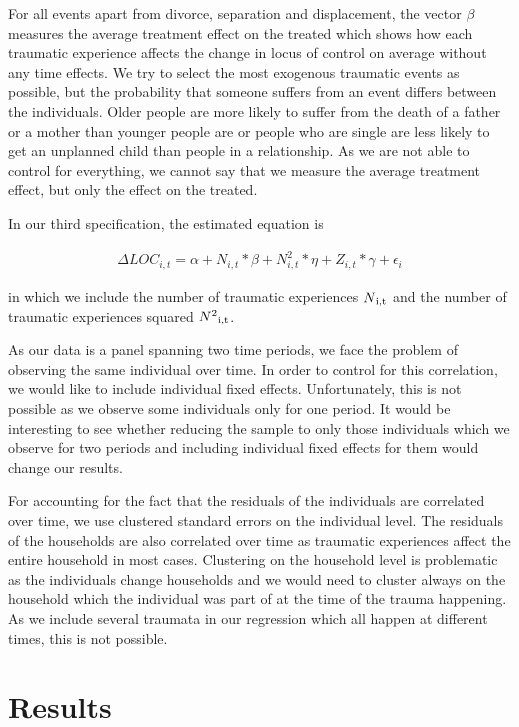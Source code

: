 \documentclass[12pt, a4paper, fleqn, parskip]{scrartcl}
\begin{document}
For all events apart from divorce, separation and displacement, the vector
$\beta$ measures the average treatment effect on the treated which shows how
each traumatic experience affects the change in locus of control on average
without any time effects. We try to select the most exogenous traumatic events
as possible, but the probability that someone suffers from an event differs
between the individuals. Older people are more likely to suffer from the death
of a father or a mother than younger people are or people who are single are
less likely to get an unplanned child than people in a relationship. As we are
not able to control for everything, we cannot say that we measure the average
treatment effect, but only the effect on the treated.

In our third specification, the estimated equation is

\begin{align}
    \Delta LOC_{i,t}= \alpha + N_{i,t} * \beta + N^{2}_{i,t} * \eta + Z_{i,t} *
    \gamma + \epsilon_{i}
\end{align}

in which we include the number of traumatic experiences $N \textsubscript{i,t}$
and the number of traumatic experiences squared $N
\textsuperscript{2}\textsubscript{i,t}$.

As our data is a panel spanning two time periods, we face the problem of
observing the same individual over time. In order to control for this
correlation, we would like to include individual fixed effects. Unfortunately,
this is not possible as we observe some individuals only for one period. It
would be interesting to see whether reducing the sample to only those
individuals which we observe for two periods and including individual fixed
effects for them would change our results.

For accounting for the fact that the residuals of the individuals are
correlated over time, we use clustered standard errors on the individual level.
The residuals of the households are also correlated over time as traumatic
experiences affect the entire household in most cases. Clustering on the
household level is problematic as the individuals change households and we
would need to cluster always on the household which the individual was part of
at the time of the trauma happening. As we include several traumata in our
regression which all happen at different times, this is not possible.

\section{Results} %
\label{sec:results}
\end{document}
